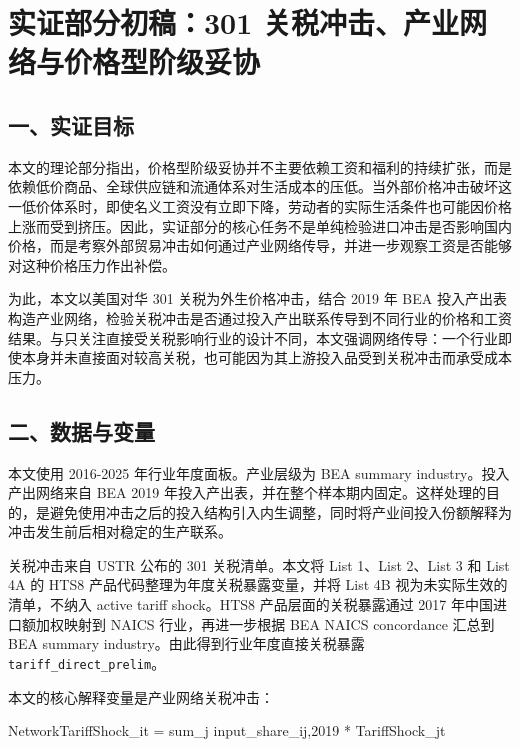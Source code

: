 \documentclass[
]{ctexart}
\author{}
\date{}
\newenvironment{Shaded}{}{}
\newcommand{\NormalTok}[1]{#1}
\begin{document}
\section{实证部分初稿：301
关税冲击、产业网络与价格型阶级妥协}\label{ux5b9eux8bc1ux90e8ux5206ux521dux7a3f301-ux5173ux7a0eux51b2ux51fbux4ea7ux4e1aux7f51ux7edcux4e0eux4ef7ux683cux578bux9636ux7ea7ux59a5ux534f}

\subsection{一、实证目标}\label{ux4e00ux5b9eux8bc1ux76eeux6807}

本文的理论部分指出，价格型阶级妥协并不主要依赖工资和福利的持续扩张，而是依赖低价商品、全球供应链和流通体系对生活成本的压低。当外部价格冲击破坏这一低价体系时，即使名义工资没有立即下降，劳动者的实际生活条件也可能因价格上涨而受到挤压。因此，实证部分的核心任务不是单纯检验进口冲击是否影响国内价格，而是考察外部贸易冲击如何通过产业网络传导，并进一步观察工资是否能够对这种价格压力作出补偿。

为此，本文以美国对华 301 关税为外生价格冲击，结合 2019 年 BEA
投入产出表构造产业网络，检验关税冲击是否通过投入产出联系传导到不同行业的价格和工资结果。与只关注直接受关税影响行业的设计不同，本文强调网络传导：一个行业即使本身并未直接面对较高关税，也可能因为其上游投入品受到关税冲击而承受成本压力。

\subsection{二、数据与变量}\label{ux4e8cux6570ux636eux4e0eux53d8ux91cf}

本文使用 2016-2025 年行业年度面板。产业层级为 BEA summary
industry。投入产出网络来自 BEA 2019
年投入产出表，并在整个样本期内固定。这样处理的目的，是避免使用冲击之后的投入结构引入内生调整，同时将产业间投入份额解释为冲击发生前后相对稳定的生产联系。

关税冲击来自 USTR 公布的 301 关税清单。本文将 List 1、List 2、List 3 和
List 4A 的 HTS8 产品代码整理为年度关税暴露变量，并将 List 4B
视为未实际生效的清单，不纳入 active tariff shock。HTS8
产品层面的关税暴露通过 2017 年中国进口额加权映射到 NAICS
行业，再进一步根据 BEA NAICS concordance 汇总到 BEA summary
industry。由此得到行业年度直接关税暴露 \texttt{tariff\_direct\_prelim}。

本文的核心解释变量是产业网络关税冲击：

\begin{Shaded}
\begin{Highlighting}[]
\NormalTok{NetworkTariffShock\_it = sum\_j input\_share\_ij,2019 * TariffShock\_jt}
\end{Highlighting}
\end{Shaded}
\end{document}
